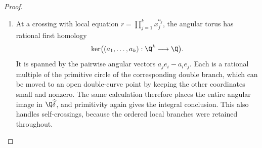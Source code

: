 \begin{proof}
\begin{enumerate}[label=\arabic*.,leftmargin=*]
\item At a crossing with local equation
$r=\prod_{j=1}^k x_j^{a_j}$, the angular torus has
rational first homology
\[
 \ker\bigl((a_1,\ldots,a_k):\Q^k\longrightarrow\Q\bigr).
\]
It is spanned by the pairwise angular vectors
$a_j e_i-a_i e_j$. Each is a rational multiple of the
primitive circle of the corresponding double branch,
which can be moved to an open double-curve point by
keeping the other coordinates small and nonzero.
The same calculation therefore places the entire angular
image in $\Q\widehat\delta$, and primitivity again gives
the integral conclusion. This also handles self-crossings,
because the ordered local branches were retained throughout.
\end{enumerate}
\end{proof}